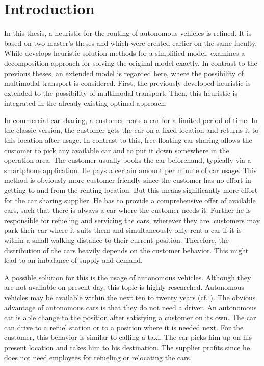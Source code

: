 \chapter{Introduction}


In this thesis, a heuristic for the routing of autonomous vehicles is refined. It is based on two master's theses \cite{Kaiser} and \cite{Knoll} which were created earlier on the same faculty. While \cite{Knoll} develops heuristic solution methods for a simplified model, \cite{Kaiser} examines a decomposition approach for solving the original model exactly. In contrast to the previous theses, an extended model is regarded here, where the possibility of multimodal transport is considered. First, the previously developed heuristic is extended to the possibility of multimodal transport. Then, this heuristic is integrated in the already existing optimal approach.

In commercial car sharing, a customer rents a car for a limited period of time. In the classic version, the customer gets the car on a fixed location and returns it to this location after usage. In contrast to this, free-floating car sharing allows the customer to pick any available car and to put it down somewhere in the operation area. The customer usually books the car beforehand, typically via a smartphone application. He pays a certain amount per minute of car usage. This method is obviously more customer-friendly since the customer has no effort in getting to and from the renting location. But this means significantly more effort for the car sharing supplier. He has to provide a comprehensive offer of available cars, such that there is always a car where the customer needs it. Further he is responsible for refueling and servicing the cars, wherever they are. customers may park their car where it suits them and simultaneously only rent a car if it is within a small walking distance to their current position. Therefore, the distribution of the cars heavily depends on the customer behavior. This might lead to an imbalance of supply and demand.

A possible solution for this is the usage of autonomous vehicles. Although they are not available on present day, this topic is highly researched. Autonomous vehicles may be available within the next ten to twenty years (cf. \cite{Hauser}). The obvious advantage of autonomous cars is that they do not need a driver. An autonomous car is able change to the position after satisfying a customer on its own. The car can drive to a refuel station or to a position where it is needed next. For the customer, this behavior is similar to calling a taxi. The car picks him up on his present location and takes him to his destination. The supplier profits since he does not need employees for refueling or relocating the cars.

